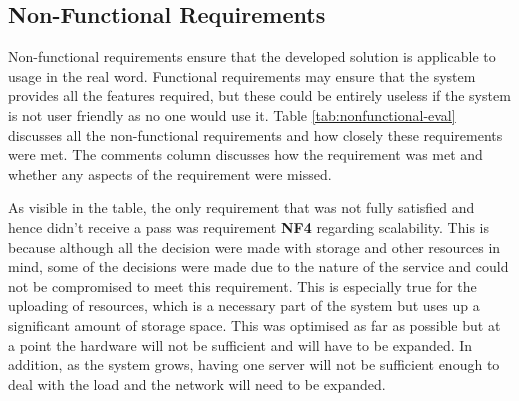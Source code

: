 \subsection{Non-Functional Requirements}
Non-functional requirements ensure that the developed solution is applicable to usage in the real word. Functional requirements may ensure that the system provides all the features required, but these could be entirely useless if the system is not user friendly as no one would use it. Table \ref{tab:nonfunctional-eval} discusses all the non-functional requirements and how closely these requirements were met. The comments column discusses how the requirement was met and whether any aspects of the requirement were missed. 

As visible in the table, the only requirement that was not fully satisfied and hence didn't receive a pass was requirement \textbf{NF4} regarding scalability. This is because although all the decision were made with storage and other resources in mind, some of the decisions were made due to the nature of the service and could not be compromised to meet this requirement. This is especially true for the uploading of resources, which is a necessary part of the system but uses up a significant amount of storage space. This was optimised as far as possible but at a point the hardware will not be sufficient and will have to be expanded. In addition, as the system grows, having one server will not be sufficient enough to deal with the load and the network will need to be expanded.

